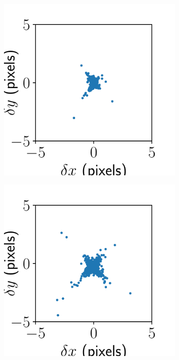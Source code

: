\documentclass{article}
\begin{document}
\begin{figure}[ht]
\begin{subfigure}{0.24\linewidth}
		\caption{}
		\label{fig:alignmentresultJHUPolaris1}
	\end{subfigure}
	\begin{subfigure}{0.24\linewidth}
		\includegraphics[width=\linewidth]{stitch-result-JHUPolaris-4.pdf}
		\caption{}
		\label{fig:stitchresultJHUPolaris4}
	\end{subfigure}
	\begin{subfigure}{0.24\linewidth}
		\includegraphics[width=\linewidth]{stitch-result-JHUPolaris-3.pdf}

\end{subfigure}
\end{figure}
\end{document}
